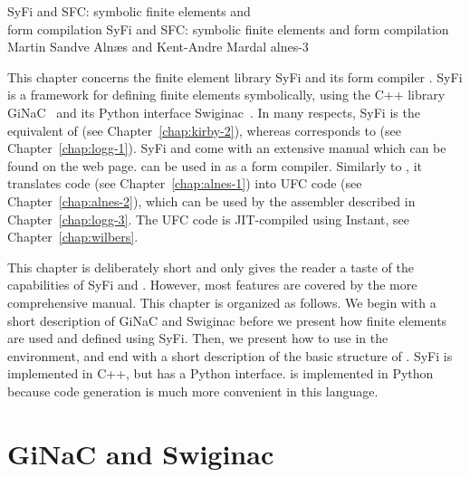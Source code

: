               {SyFi and SFC: symbolic finite elements and \\ form compilation}
              {SyFi and SFC: symbolic finite elements and form compilation}
              {Martin Sandve Aln\ae{}s and Kent-Andre Mardal}
              {alnes-3}

\renewcommand{\AA}{A}
\newcommand{\LL}{L}
\newcommand{\JJ}{J}
\newcommand{\syfi}{SyFi}


This chapter concerns the finite element library \syfi{} and its form
compiler \sfc{}.  \syfi{} is a framework for defining finite elements
symbolically, using the C++ library
GiNaC~\citep{BauerFrinkKreckel2000} and its Python interface
Swiginac~\citep{SkavhaugCertik2009}. In many respects, \syfi{} is the
equivalent of \fiat (see Chapter~\ref{chap:kirby-2}), whereas \sfc{}
corresponds to \ffc{} (see Chapter~\ref{chap:logg-1}). \syfi{}
and \sfc{} come with an extensive manual \citep{AlnaesMardal2009a}
which can be found on the \fenics{} web page. \sfc{} can be used in
\fenics{} as a form compiler. Similarly to \ffc{}, it translates
\ufl{} code (see Chapter~\ref{chap:alnes-1}) into UFC code (see
Chapter~\ref{chap:alnes-2}), which can be used by the \dolfin{}
assembler described in Chapter~\ref{chap:logg-3}. The UFC code is
JIT-compiled using Instant, see Chapter~\ref{chap:wilbers}.

This chapter is deliberately short and only gives the reader a taste
of the capabilities of \syfi{} and \sfc{}. However, most features are
covered by the more comprehensive manual. This chapter is organized as
follows.  We begin with a short description of GiNaC and Swiginac
before we present how finite elements are used and defined
using \syfi{}. Then, we present how to use \sfc{} in the \dolfin{}
environment, and end with a short description of the basic structure
of \sfc{}. \syfi{} is implemented in C++, but has a Python
interface. \sfc{} is implemented in Python because code generation is
much more convenient in this language.

\section{GiNaC and Swiginac}

